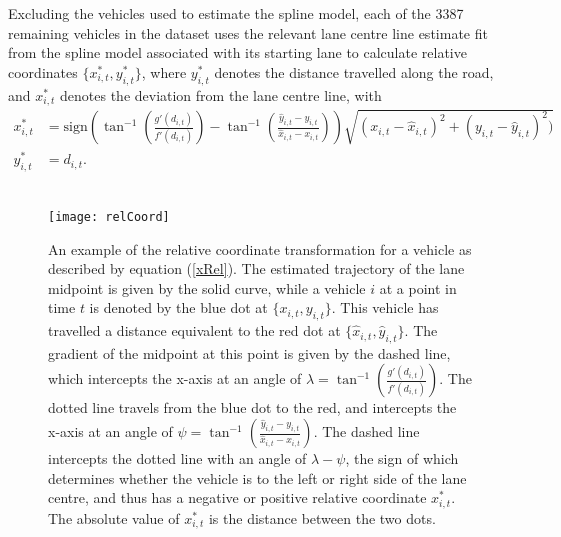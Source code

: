 \documentclass[12pt,a4paper]{article}\usepackage[]{graphicx}\usepackage[]{color}
\begin{document}
Excluding the vehicles used to estimate the spline model, each of the 3387 remaining vehicles in the dataset uses the relevant lane centre line estimate fit from the spline model associated with its starting lane to calculate relative coordinates $\{x^*_{i, t}, y^*_{i, t}\}$, where $y^*_{i, t}$ denotes the distance travelled along the road, and $x^*_{i, t}$ denotes the deviation from the lane centre line, with
\begin{align}
x^*_{i, t} &= \mbox{sign}\left(\tan^{-1}\left(\frac{g'(d_{i, t}) }{f'(d_{i, t})}\right) - \tan^{-1}\left(\frac{\hat{y}_{i, t} - y_{i, t}}{\hat{x}_{i, t} - x_{i, t}} \right)\right)\sqrt{(x_{i, t}-\hat{x}_{i, t})^2 + (y_{i, t} - \hat{y}_{i, t})^2)} \label{xRel} \\
y^*_{i, t} &= d_{i, t}. \label{yRel}
\end{align}
\\

\begin{figure}
\centering
\texttt{[image: relCoord]}
\caption{An example of the relative coordinate transformation for a vehicle as described by equation (\ref{xRel}). The estimated trajectory of the lane midpoint is given by the solid curve, while a vehicle $i$ at a point in time $t$ is denoted by the blue dot at $\{x_{i, t}, y_{i, t}\}$. This vehicle has travelled a distance equivalent to the red dot at $\{\hat{x}_{i, t}, \hat{y}_{i, t}\}$. The gradient of the midpoint at this point is given by the dashed line, which intercepts the x-axis at an angle of $\lambda = \tan^{-1}\left(\frac{g'(d_{i, t}) }{f'(d_{i, t})}\right)$. The dotted line travels from the blue dot to the red, and intercepts the x-axis at an angle of $\psi = \tan^{-1}\left(\frac{\hat{y}_{i, t} - y_{i, t}}{\hat{x}_{i, t} - x_{i, t}} \right)$. The dashed line intercepts the dotted line with an angle  of $\lambda - \psi$, the sign of which determines whether the vehicle is to the left or right side of the lane centre, and thus has a negative or positive relative coordinate $x^*_{i, t}$. The absolute value of $x^*_{i, t}$ is the distance between the two dots.}
\label{fig:relCoord}
\end{figure}
\end{document}
